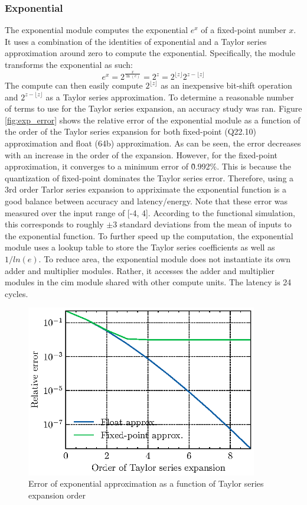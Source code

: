 \documentclass[12pt, hidelinks]{article}
\begin{document}
\subsubsection{Exponential}
The exponential module computes the exponential $e^{x}$ of a fixed-point number $x$. It uses a combination of the identities of exponential and a Taylor series approximation around zero to compute the exponential.
Specifically, the module transforms the exponential as such:
\begin{equation}
    e^{x} = 2^{\frac{x}{\ln(e)}} = 2^{z} = 2^{\lfloor{z}\rfloor}2^{z-\lfloor{z}\rfloor}
\end{equation}
\label{eq:exp_transform}
The compute can then easily compute $2^{\lfloor{z}\rfloor}$ as an inexpensive bit-shift operation and $2^{z-\lfloor{z}\rfloor}$ as a Taylor series approximation. To determine a reasonable number of terms to use
for the Taylor series expansion, an accuracy study was ran. Figure \ref{fig:exp_error} shows the relative error of the exponential module as a function of the order of the Taylor series expansion for both fixed-point (Q22.10)
approximation and float (64b) approximation. As can be seen, the error decreases with an increase in the order of the expansion. However, for the fixed-point approximation, it converges to a minimum error of \~0.992\%. This
is because the quantization of fixed-point dominates the Taylor series error. Therefore, using a 3rd order Tarlor series expansion to appriximate the exponential function is a good balance between accuracy and latency/energy.
Note that these error was measured over the input range of [-4, 4]. According to the functional simulation, this corresponds to roughly $\pm3$ standard deviations from the mean of inputs to the exponential function.
To further speed up the computation, the exponential module uses a lookup table to store the Taylor series coefficients as well as $1/ln(e)$. To reduce area, the exponential module does not instantiate its own adder and
multiplier modules. Rather, it accesses the adder and multiplier modules in the \ac{cim} module shared with other compute units. The latency is 24 cycles.
\begin{figure}
    \centering
    \caption{Error of exponential approximation as a function of Taylor series expansion order}
    \includegraphics[width=0.9\textwidth]{assets/exp_approx_error.eps}
\end{figure}
\label{fig:exp_error}
\end{document}
